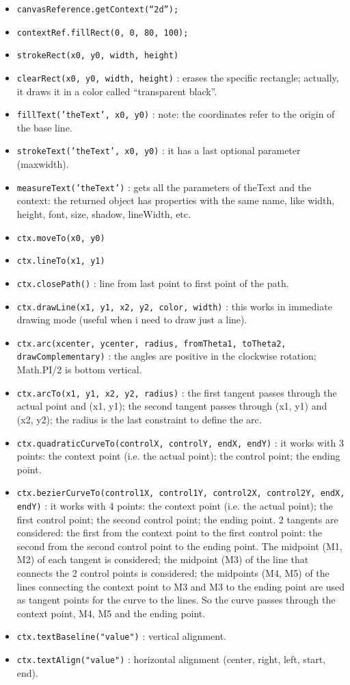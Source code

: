 \documentclass[a4paper,11pt]{book}
\begin{document}
	\begin{itemize}	
	\item \texttt{canvasReference.getContext(``2d'');}
	\item \texttt{contextRef.fillRect(0, 0, 80, 100);}
	\item \texttt{strokeRect(x0, y0, width, height)}
	\item \texttt{clearRect(x0, y0, width, height)} : erases the specific rectangle; actually,
				it draws it in a color called ``transparent black''.
	\item \texttt{fillText('theText', x0, y0)} : note: the coordinates refer to the origin of the base line.
	\item \texttt{strokeText('theText', x0, y0)} : it has a last optional parameter (maxwidth).
	\item \texttt{measureText('theText')} : gets all the parameters of theText and the context: the returned
				object has properties with the same name, like width, height, font, size, shadow, lineWidth, etc.
	\item \texttt{ctx.moveTo(x0, y0)}
	\item \texttt{ctx.lineTo(x1, y1)}
	\item \texttt{ctx.closePath()} : line from last point to first point of the path.
	\item \texttt{ctx.drawLine(x1, y1, x2, y2, color, width)} : this works in immediate drawing mode (useful when i need
			to draw just a line).
	\item \texttt{ctx.arc(xcenter, ycenter, radius, fromTheta1, toTheta2, drawComplementary)} : the angles are positive
			in the clockwise rotation; Math.PI/2 is bottom vertical.
	\item \texttt{ctx.arcTo(x1, y1, x2, y2, radius)} : the first tangent passes through the actual point and (x1, y1);
			the second tangent passes through (x1, y1) and (x2, y2); the radius is the last constraint to define the arc.
	\item \texttt{ctx.quadraticCurveTo(controlX, controlY, endX, endY)} : it works with 3 points: the context point (i.e.
			the actual point); the control point; the ending point.
	\item \texttt{ctx.bezierCurveTo(control1X, control1Y, control2X, control2Y, endX, endY)} : it works with 4 points: the
			context point (i.e. the actual point); the first control point; the second control point; the ending point.
			2 tangents are considered: the first from the context point to the first control point: the second from the
			second control point to the ending point. The midpoint (M1, M2) of each tangent is considered; the midpoint
			(M3) of the line that connects the 2 control points is considered; the midpoints (M4, M5) of the lines
			connecting the context point to M3 and M3 to the ending point are used as tangent points for the curve to
			the lines. So the curve passes through the context point, M4, M5 and the ending point.			
	\item \texttt{ctx.textBaseline("value")} : vertical alignment.
	\item \texttt{ctx.textAlign("value")} : horizontal alignment (center, right, left, start, end).
	\end{itemize}
	
\end{document}

